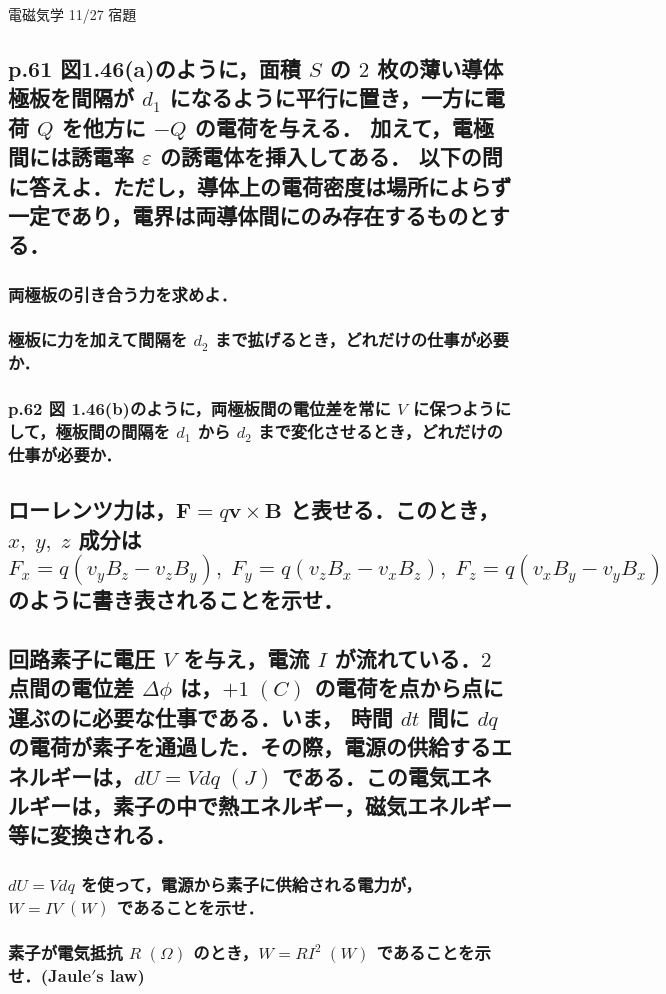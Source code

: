 \documentclass[a4paper, 12pt]{bxjsarticle}
\begin{document}
\begin{center}
    \begin{huge}
        電磁気学 11/27 宿題
    \end{huge}
\end{center}

\begin{samepage}
\subsection{p.61 図1.46(a)のように，面積 \(S\) の \(2\) 枚の薄い導体極板を間隔が \(d_1\) になるように平行に置き，一方に電荷 \(Q\) を他方に \(-Q\) の電荷を与える．%
加えて，電極間には誘電率 \(\varepsilon\) の誘電体を挿入してある．%
以下の問に答えよ．ただし，導体上の電荷密度は場所によらず一定であり，電界は両導体間にのみ存在するものとする．}
\subsubsection{両極板の引き合う力を求めよ．}
\vspace{13em}
\subsubsection{極板に力を加えて間隔を \(d_2\) まで拡げるとき，どれだけの仕事が必要か．}
\vspace{13em}
\subsubsection{p.62 図 1.46(b)のように，両極板間の電位差を常に \(V\) に保つようにして，極板間の間隔を \(d_1\) から \(d_2\) まで変化させるとき，どれだけの仕事が必要か．}
\end{samepage}

\newpage
\subsection{ローレンツ力は，\(\boldsymbol{F}=q\boldsymbol{v}\times\boldsymbol{B}\) と表せる．このとき，\(x,\;y,\;z\) 成分は\[%
    F_x=q(v_yB_z-v_zB_y),\;F_y=q(v_zB_x-v_xB_z),\;F_z=q(v_xB_y-v_yB_x)\]のように書き表されることを示せ．}
\newpage

\subsection{回路素子に電圧 \(V\) を与え，電流 \(I\) が流れている．\(2\) 点間の電位差 \(\Delta \phi\) は，\(+1\;\si{(C)}\) の電荷を点から点に運ぶのに必要な仕事である．いま，%
時間 \(dt\) 間に \(dq\) の電荷が素子を通過した．その際，電源の供給するエネルギーは，\(dU = Vdq\;\si{(J)}\) である．この電気エネルギーは，素子の中で熱エネルギー，磁気エネルギー%
等に変換される．}
\subsubsection{\(dU=Vdq\) を使って，電源から素子に供給される電力が，\(W=IV\;\si{(W)}\) であることを示せ．}
\vspace{20em}
\subsubsection{素子が電気抵抗 \(R\;\si{(\Omega)}\) のとき，\(W=RI^2\;\si{(W)}\) であることを示せ．(Jaule\('\)s law)}
\end{document}
